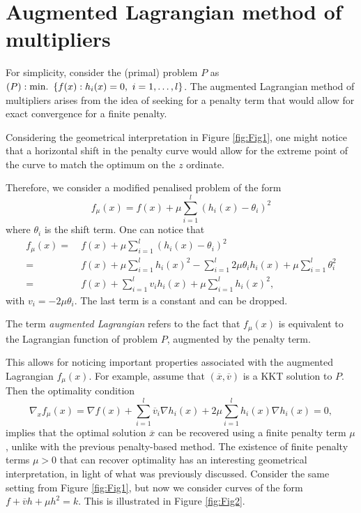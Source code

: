 \section{Augmented Lagrangian method of multipliers}


For simplicity, consider the (primal) problem $P$ as $(P) : \mathop{\text{min.~}}\left\{ f(x) : h_i(x) = 0, \ i = 1,\dots, l \right \}$. The augmented Lagrangian method of multipliers arises from the idea of seeking for a penalty term that would allow for exact convergence for a finite penalty. 

Considering the geometrical interpretation in Figure \ref{fig:Fig1}, one might notice that a horizontal shift in the penalty curve would allow for the extreme point of the curve to match the optimum on the $z$ ordinate. 

Therefore, we consider a modified penalised problem of the form
$$
f_\mu(x) = f(x) + \mu\sum_{i=1}^l(h_i(x) - \theta_i)^2
$$
where $\theta_i$ is the shift term. One can notice that
%
\begin{align*}
f_\mu(x) = \ & f(x) + \mu\sum_{i=1}^l(h_i(x) - \theta_i)^2\\
= \ & f(x) + \mu\sum_{i=1}^lh_i(x)^2 - \sum_{i=1}^l2\mu\theta_ih_i(x) + \mu\sum_{i=1}^l\theta_i^2\\
= \ & f(x) + \sum_{i=1}^lv_ih_i(x) + \mu\sum_{i=1}^lh_i(x)^2,   
\end{align*}
with $v_i = -2\mu\theta_i$. The last term is a constant and can be dropped.  

The term \emph{augmented Lagrangian} refers to the fact that 
$f_\mu(x)$ is equivalent to the Lagrangian function of problem $P$, augmented by the penalty term. 

This allows for noticing important properties associated with the augmented Lagrangian $f_\mu(x)$. For example, assume that $(\overline{x},\overline{v})$ is a KKT solution to $P$. Then the optimality condition 
$$ 
\nabla_x f_\mu(x) = \nabla f(x) + \sum_{i=1}^l \overline{v}_i\nabla h_i(x) + 2\mu\sum_{i=1}^l h_i(x)\nabla h_i(x) = 0,
$$ 
implies that the optimal solution $\overline{x}$ can be recovered using a finite penalty term $\mu$, unlike with the previous penalty-based method. The existence of finite penalty terms $\mu > 0$ that can recover optimality has an interesting geometrical interpretation, in light of what was previously discussed. Consider the same setting from Figure \ref{fig:Fig1}, but now we consider curves of the form $f + \overline{v}h + \mu h^2 = k$. This is illustrated in Figure \ref{fig:Fig2}. 

